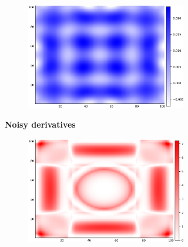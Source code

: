 \documentclass{article}
\begin{document}
\begin{figure}
\begin{subfigure}[b]{.5\textwidth}
\begin{subfigure}[b]{.5\textwidth}
      \end{subfigure}%
      \begin{subfigure}[b]{.5\textwidth}
        \centering
        \includegraphics[scale=0.27]{figures/heatmaps/variance-noisy-25.png}
      \end{subfigure}
      \caption{\textbf{Noisy derivatives}}
    \end{subfigure}%
    \begin{subfigure}[b]{.5\textwidth}
      \centering
      \begin{subfigure}[b]{.5\textwidth}
        \centering
        \includegraphics[scale=0.27]{figures/heatmaps/error-length-25.png}
      \end{subfigure}%
      \begin{subfigure}[b]{.5\textwidth}
        \centering

\end{subfigure}
\end{subfigure}
\end{figure}
\end{document}
